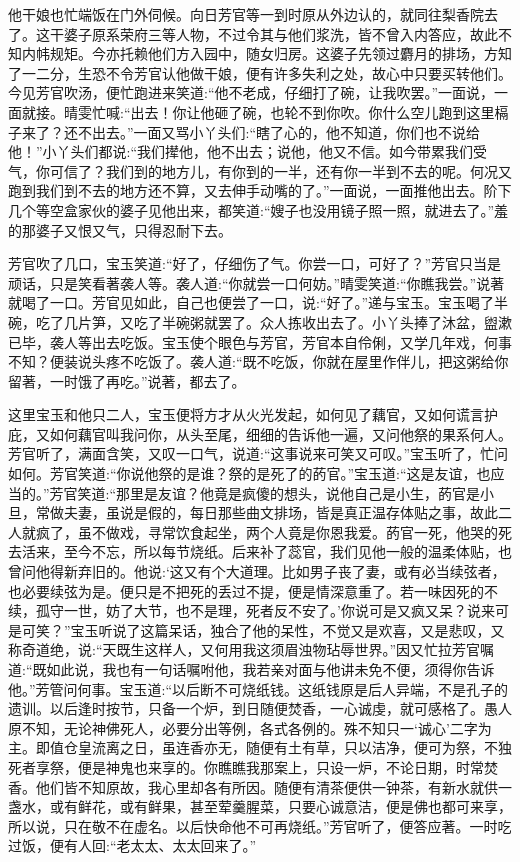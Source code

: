 \begin{parag}
    他干娘也忙端饭在门外伺候。向日芳官等一到时原从外边认的，就同往梨香院去了。这干婆子原系荣府三等人物，不过令其与他们浆洗，皆不曾入内答应，故此不知内帏规矩。今亦托赖他们方入园中，随女归房。这婆子先领过麝月的排场，方知了一二分，生恐不令芳官认他做干娘，便有许多失利之处，故心中只要买转他们。今见芳官吹汤，便忙跑进来笑道:“他不老成，仔细打了碗，让我吹罢。”一面说，一面就接。晴雯忙喊:“出去！你让他砸了碗，也轮不到你吹。你什么空儿跑到这里槅子来了？还不出去。”一面又骂小丫头们:“瞎了心的，他不知道，你们也不说给他！”小丫头们都说:“我们撵他，他不出去；说他，他又不信。如今带累我们受气，你可信了？我们到的地方儿，有你到的一半，还有你一半到不去的呢。何况又跑到我们到不去的地方还不算，又去伸手动嘴的了。”一面说，一面推他出去。阶下几个等空盒家伙的婆子见他出来，都笑道:“嫂子也没用镜子照一照，就进去了。”羞的那婆子又恨又气，只得忍耐下去。
\end{parag}


\begin{parag}
    芳官吹了几口，宝玉笑道:“好了，仔细伤了气。你尝一口，可好了？”芳官只当是顽话，只是笑看著袭人等。袭人道:“你就尝一口何妨。”晴雯笑道:“你瞧我尝。”说著就喝了一口。芳官见如此，自己也便尝了一口，说:“好了。”递与宝玉。宝玉喝了半碗，吃了几片笋，又吃了半碗粥就罢了。众人拣收出去了。小丫头捧了沐盆，盥漱已毕，袭人等出去吃饭。宝玉使个眼色与芳官，芳官本自伶俐，又学几年戏，何事不知？便装说头疼不吃饭了。袭人道:“既不吃饭，你就在屋里作伴儿，把这粥给你留著，一时饿了再吃。”说著，都去了。
\end{parag}


\begin{parag}
    这里宝玉和他只二人，宝玉便将方才从火光发起，如何见了藕官，又如何谎言护庇，又如何藕官叫我问你，从头至尾，细细的告诉他一遍，又问他祭的果系何人。芳官听了，满面含笑，又叹一口气，说道:“这事说来可笑又可叹。”宝玉听了，忙问如何。芳官笑道:“你说他祭的是谁？祭的是死了的菂官。”宝玉道:“这是友谊，也应当的。”芳官笑道:“那里是友谊？他竟是疯傻的想头，说他自己是小生，菂官是小旦，常做夫妻，虽说是假的，每日那些曲文排场，皆是真正温存体贴之事，故此二人就疯了，虽不做戏，寻常饮食起坐，两个人竟是你恩我爱。菂官一死，他哭的死去活来，至今不忘，所以每节烧纸。后来补了蕊官，我们见他一般的温柔体贴，也曾问他得新弃旧的。他说:‘这又有个大道理。比如男子丧了妻，或有必当续弦者，也必要续弦为是。便只是不把死的丢过不提，便是情深意重了。若一味因死的不续，孤守一世，妨了大节，也不是理，死者反不安了。’你说可是又疯又呆？说来可是可笑？”宝玉听说了这篇呆话，独合了他的呆性，不觉又是欢喜，又是悲叹，又称奇道绝，说:“天既生这样人，又何用我这须眉浊物玷辱世界。”因又忙拉芳官嘱道:“既如此说，我也有一句话嘱咐他，我若亲对面与他讲未免不便，须得你告诉他。”芳管问何事。宝玉道:“以后断不可烧纸钱。这纸钱原是后人异端，不是孔子的遗训。以后逢时按节，只备一个炉，到日随便焚香，一心诚虔，就可感格了。愚人原不知，无论神佛死人，必要分出等例，各式各例的。殊不知只一‘诚心’二字为主。即值仓皇流离之日，虽连香亦无，随便有土有草，只以洁净，便可为祭，不独死者享祭，便是神鬼也来享的。你瞧瞧我那案上，只设一炉，不论日期，时常焚香。他们皆不知原故，我心里却各有所因。随便有清茶便供一钟茶，有新水就供一盏水，或有鲜花，或有鲜果，甚至荤羹腥菜，只要心诚意洁，便是佛也都可来享，所以说，只在敬不在虚名。以后快命他不可再烧纸。”芳官听了，便答应著。一时吃过饭，便有人回:“老太太、太太回来了。”
\end{parag}
